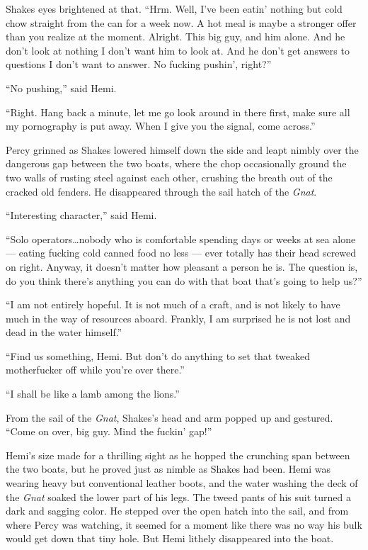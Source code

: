 \documentclass[
]{scrbook}
\begin{document}
Shakes eyes brightened at that. ``Hrm. Well, I've been eatin' nothing
but cold chow straight from the can for a week now. A hot meal is maybe
a stronger offer than you realize at the moment. Alright. This big guy,
and him alone. And he don't look at nothing I don't want him to look at.
And he don't get answers to questions I don't want to answer. No fucking
pushin', right?''

``No pushing,'' said Hemi.

``Right. Hang back a minute, let me go look around in there first, make
sure all my pornography is put away. When I give you the signal, come
across.''

Percy grinned as Shakes lowered himself down the side and leapt nimbly
over the dangerous gap between the two boats, where the chop
occasionally ground the two walls of rusting steel against each other,
crushing the breath out of the cracked old fenders. He disappeared
through the sail hatch of the \emph{Gnat}.

``Interesting character,'' said Hemi.

``Solo operators\ldots nobody who is comfortable spending days or weeks
at sea alone --- eating fucking cold canned food no less --- ever
totally has their head screwed on right. Anyway, it doesn't matter how
pleasant a person he is. The question is, do you think there's anything
you can do with that boat that's going to help us?''

``I am not entirely hopeful. It is not much of a craft, and is not
likely to have much in the way of resources aboard. Frankly, I am
surprised he is not lost and dead in the water himself.''

``Find us something, Hemi. But don't do anything to set that tweaked
motherfucker off while you're over there.''

``I shall be like a lamb among the lions.''

From the sail of the \emph{Gnat}, Shakes's head and arm popped up and
gestured. ``Come on over, big guy. Mind the fuckin' gap!''

Hemi's size made for a thrilling sight as he hopped the crunching span
between the two boats, but he proved just as nimble as Shakes had been.
Hemi was wearing heavy but conventional leather boots, and the water
washing the deck of the \emph{Gnat} soaked the lower part of his legs.
The tweed pants of his suit turned a dark and sagging color. He stepped
over the open hatch into the sail, and from where Percy was watching, it
seemed for a moment like there was no way his bulk would get down that
tiny hole. But Hemi lithely disappeared into the boat.
\end{document}

